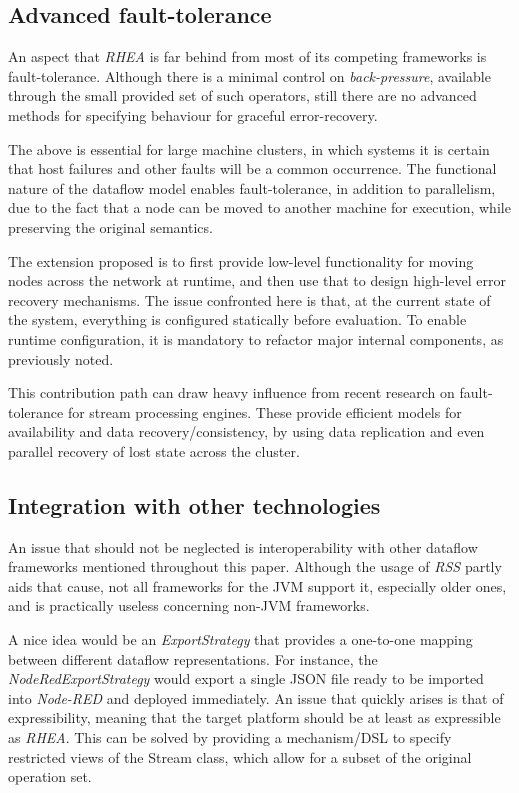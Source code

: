 \documentclass[sigplan,review,anonymous]{acmart}\settopmatter{printfolios=true}
\begin{document}
\subsection{Advanced fault-tolerance}

An aspect that \textit{RHEA} is far behind from most of its competing frameworks is fault-tolerance. Although there is a minimal control on \textit{back-pressure}, available through the small provided set of such operators, still there are no advanced methods for specifying behaviour for graceful error-recovery.

The above is essential for large machine clusters, in which systems it is certain that host failures and other faults will be a common occurrence. The functional nature of the dataflow model enables fault-tolerance, in addition to parallelism, due to the fact that a node can be moved to another machine for execution, while preserving the original semantics.

The extension proposed is to first provide low-level functionality for moving nodes across the network at runtime, and then use that to design high-level error recovery mechanisms. The issue confronted here is that, at the current state of the system, everything is configured statically before evaluation. To enable runtime configuration, it is mandatory to refactor major internal components, as previously noted.

This contribution path can draw heavy influence from recent research on fault-tolerance for stream processing engines\cite{borealis,dstreams,wide_area}. These provide efficient models for availability and data recovery/consistency, by using data replication and even parallel recovery of lost state across the cluster.

\subsection{Integration with other technologies}

An issue that should not be neglected is interoperability with other dataflow frameworks mentioned throughout this paper. Although the usage of \textit{RSS} partly aids that cause, not all frameworks for the JVM support it, especially older ones, and is practically useless concerning non-JVM frameworks.

A nice idea would be an \textit{ExportStrategy} that provides a one-to-one mapping between different dataflow representations. For instance, the \textit{NodeRedExportStrategy} would export a single JSON file ready to be imported into \textit{Node-RED} and deployed immediately. An issue that quickly arises is that of expressibility, meaning that the target platform should be at least as expressible as \textit{RHEA}. This can be solved by providing a mechanism/DSL to specify restricted views of the Stream class, which allow for a subset of the original operation set. 
\end{document}
